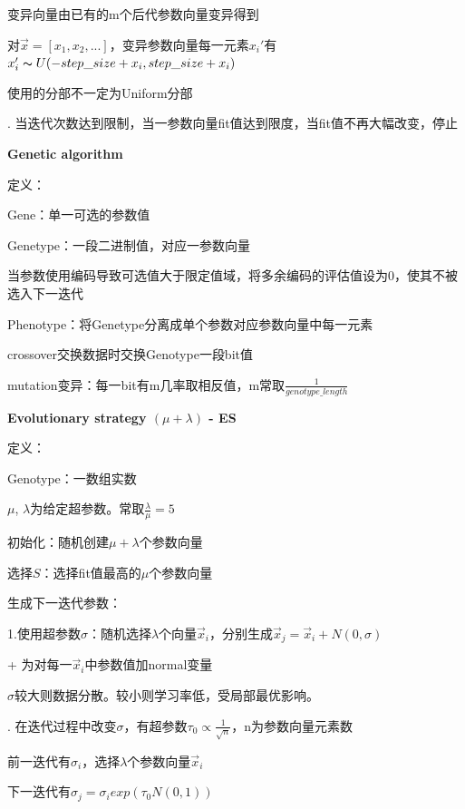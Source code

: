 \documentclass[UTF8]{ctexart}
\begin{document}
  \quad \quad 变异向量由已有的m个后代参数向量变异得到

  \quad \quad \quad 对$\vec{x} = [x_1, x_2, ...]$，变异参数向量每一元素$x_i'$有$x_i' \thicksim U(-step\_size + x_i, step\_size + x_i)$

  \quad \quad \quad 使用的分部不一定为Uniform分部

  . 当迭代次数达到限制，当一参数向量fit值达到限度，当fit值不再大幅改变，停止

  \textbf{Genetic algorithm}
  
  \quad 定义：

  \quad \quad Gene：单一可选的参数值
  
  \quad \quad Genetype：一段二进制值，对应一参数向量
  
  \quad \quad \quad 当参数使用编码导致可选值大于限定值域，将多余编码的评估值设为0，使其不被选入下一迭代

  \quad \quad Phenotype：将Genetype分离成单个参数对应参数向量中每一元素

  \quad crossover交换数据时交换Genotype一段bit值

  \quad mutation变异：每一bit有m几率取相反值，m常取$\frac{1}{genotype\_length}$

  \textbf{Evolutionary strategy $(\mu + \lambda)$ - ES}

  \quad 定义： 

  \quad \quad Genotype：一数组实数

  \quad \quad $\mu$, $\lambda$为给定超参数。常取$\frac{\lambda}{\mu} = 5$

  \quad 初始化：随机创建$\mu + \lambda$个参数向量

  \quad 选择$S$：选择fit值最高的$\mu$个参数向量

  \quad 生成下一迭代参数：
  
  \quad \quad 1.使用超参数$\sigma$：随机选择$\lambda$个向量$\vec{x}_i$，分别生成$\vec{x}_j = \vec{x}_i + N(0, \sigma)$

  \quad \quad \quad + 为对每一$\vec{x}_i$中参数值加normal变量

  \quad \quad \quad $\sigma$较大则数据分散。较小则学习率低，受局部最优影响。

  \quad {}. 在迭代过程中改变$\sigma$，有超参数$\tau_0 \propto \frac{1}{\sqrt{n}}$，n为参数向量元素数

  \quad \quad \quad 前一迭代有$\sigma_i$，选择$\lambda$个参数向量$\vec{x}_i$

  \quad \quad \quad 下一迭代有$\sigma_j = \sigma_i exp(\tau_0N(0, 1))$
\end{document}

